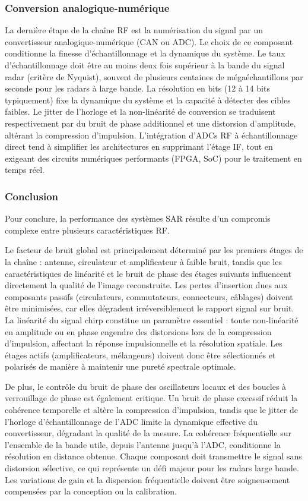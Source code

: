 \subsubsection{Conversion analogique-numérique}

La dernière étape de la chaîne RF est la numérisation du signal par un convertisseur analogique-numérique (CAN ou ADC). Le choix de ce composant conditionne la finesse d’échantillonnage et la dynamique du système. Le taux d’échantillonnage doit être au moins deux fois supérieur à la bande du signal radar (critère de Nyquist), souvent de plusieurs centaines de mégaéchantillons par seconde pour les radars à large bande. La résolution en bits (12 à 14 bits typiquement) fixe la dynamique du système et la capacité à détecter des cibles faibles. Le jitter de l’horloge et la non-linéarité de conversion se traduisent respectivement par du bruit de phase additionnel et une distorsion d’amplitude, altérant la compression d’impulsion. L’intégration d’ADCs RF à échantillonnage direct tend à simplifier les architectures en supprimant l’étage IF, tout en exigeant des circuits numériques performants (FPGA, SoC) pour le traitement en temps réel.

\subsubsection{Conclusion}

Pour conclure, la performance des systèmes SAR résulte d’un compromis complexe entre plusieurs caractéristiques RF.

Le facteur de bruit global est principalement déterminé par les premiers étages de la chaîne : antenne, circulateur et amplificateur à faible bruit, tandis que les caractéristiques de linéarité et le bruit de phase des étages suivants influencent directement la qualité de l’image reconstruite. Les pertes d’insertion dues aux composants passifs (circulateurs, commutateurs, connecteurs, câblages) doivent être minimisées, car elles dégradent irréversiblement le rapport signal sur bruit. La linéarité du signal chirp constitue un paramètre essentiel : toute non-linéarité en amplitude ou en phase engendre des distorsions lors de la compression d’impulsion, affectant la réponse impulsionnelle et la résolution spatiale. Les étages actifs (amplificateurs, mélangeurs) doivent donc être sélectionnés et polarisés de manière à maintenir une pureté spectrale optimale. 

De plus, le contrôle du bruit de phase des oscillateurs locaux et des boucles à verrouillage de phase est également critique. Un bruit de phase excessif réduit la cohérence temporelle et altère la compression d’impulsion, tandis que le jitter de l’horloge d’échantillonnage de l’ADC limite la dynamique effective du convertisseur, dégradant la qualité de la mesure. La cohérence fréquentielle sur l’ensemble de la bande utile, depuis l’antenne jusqu’à l’ADC, conditionne la résolution en distance obtenue. 
Chaque composant doit transmettre le signal sans distorsion sélective, ce qui représente un défi majeur pour les radars large bande. Les variations de gain et la dispersion fréquentielle doivent être soigneusement compensées par la conception ou la calibration. 

